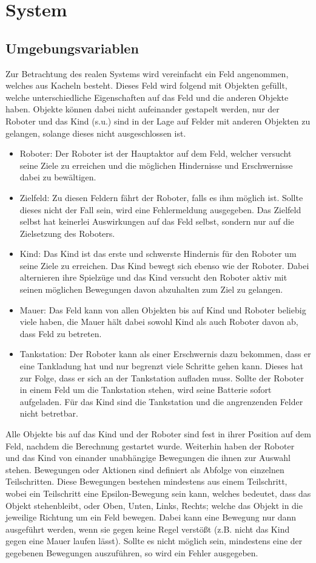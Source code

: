 \section{System}
\subsection{Umgebungsvariablen}
Zur Betrachtung des realen Systems wird vereinfacht ein Feld angenommen, welches aus Kacheln besteht. Dieses Feld wird folgend mit Objekten gefüllt, welche unterschiedliche Eigenschaften auf das Feld und die anderen Objekte haben. Objekte können dabei nicht aufeinander gestapelt werden, nur der Roboter und das Kind (s.u.) sind in der Lage auf Felder mit anderen Objekten zu gelangen, solange dieses nicht ausgeschlossen ist.
\begin{itemize}
	\item Roboter: Der Roboter ist der Hauptaktor auf dem Feld, welcher versucht seine Ziele zu erreichen und die möglichen Hindernisse und Erschwernisse dabei zu bewältigen.
	\item Zielfeld: Zu diesen Feldern fährt der Roboter, falls es ihm möglich ist. Sollte dieses nicht der Fall sein, wird eine Fehlermeldung ausgegeben. Das Zielfeld selbst hat keinerlei Auswirkungen auf das Feld selbst, sondern nur auf die Zielsetzung des Roboters.
	\item Kind: Das Kind ist das erste und schwerste Hindernis für den Roboter um seine Ziele zu erreichen. Das Kind bewegt sich ebenso wie der Roboter. Dabei alternieren ihre Spielzüge und das Kind versucht den Roboter aktiv mit seinen möglichen Bewegungen davon abzuhalten zum Ziel zu gelangen.
	\item Mauer: Das Feld kann von allen Objekten bis auf Kind und Roboter beliebig viele haben, die Mauer hält dabei sowohl Kind als auch Roboter davon ab, dass Feld zu betreten.
	\item Tankstation: Der Roboter kann als einer Erschwernis dazu bekommen, dass er eine Tankladung hat und nur begrenzt viele Schritte gehen kann. Dieses hat zur Folge, dass er sich an der Tankstation aufladen muss. Sollte der Roboter in einem Feld um die Tankstation stehen, wird seine Batterie sofort aufgeladen. Für das Kind sind die Tankstation und die angrenzenden Felder nicht betretbar.
\end{itemize}
Alle Objekte bis auf das Kind und der Roboter sind fest in ihrer Position auf dem Feld, nachdem die Berechnung gestartet wurde. Weiterhin haben der Roboter und das Kind von einander unabhängige Bewegungen die ihnen zur Auswahl stehen. Bewegungen oder Aktionen sind definiert als Abfolge von einzelnen Teilschritten. Diese Bewegungen bestehen mindestens aus einem Teilschritt, wobei ein Teilschritt eine Epsilon-Bewegung sein kann, welches bedeutet, dass das Objekt stehenbleibt, oder Oben, Unten, Links, Rechts; welche das Objekt in die jeweilige Richtung um ein Feld bewegen. Dabei kann eine Bewegung nur dann ausgeführt werden, wenn sie gegen keine Regel verstößt (z.B. nicht das Kind gegen eine Mauer laufen lässt). Sollte es nicht möglich sein, mindestens eine der gegebenen Bewegungen auszuführen, so wird ein Fehler ausgegeben. \\
